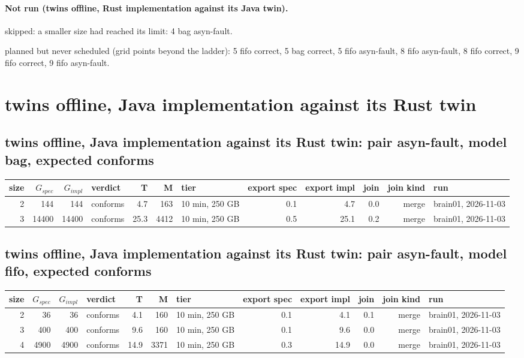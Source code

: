\documentclass[10pt]{article}
\begin{document}
\paragraph{Not run (twins offline, Rust implementation against its Java twin).}
skipped: a smaller size had reached its limit: 4 bag asyn-fault.\par
planned but never scheduled (grid points beyond the ladder): 5 fifo correct, 5 bag correct, 5 fifo asyn-fault, 8 fifo asyn-fault, 8 fifo correct, 9 fifo correct, 9 fifo asyn-fault.\par
\section*{twins offline, Java implementation against its Rust twin}
\subsection*{twins offline, Java implementation against its Rust twin: pair \textsf{asyn-fault}, model bag, expected conforms}
\begin{longtable}{@{}rrrlrrlrrrrl@{}}
\toprule
size & $G_{\mathit{spec}}$ & $G_{\mathit{impl}}$ & verdict & T & M & tier & export spec & export impl & join & join kind & run \\
\midrule
\endhead
\color{blue} 2 & 144 & 144 & conforms & 4.7 & 163 & 10 min, 250 GB & 0.1 & 4.7 & 0.0 & merge & brain01, 2026-11-03 \\
\color{blue} 3 & 14400 & 14400 & conforms & 25.3 & 4412 & 10 min, 250 GB & 0.5 & 25.1 & 0.2 & merge & brain01, 2026-11-03 \\
\bottomrule
\end{longtable}
\subsection*{twins offline, Java implementation against its Rust twin: pair \textsf{asyn-fault}, model fifo, expected conforms}
\begin{longtable}{@{}rrrlrrlrrrrl@{}}
\toprule
size & $G_{\mathit{spec}}$ & $G_{\mathit{impl}}$ & verdict & T & M & tier & export spec & export impl & join & join kind & run \\
\midrule
\endhead
\color{blue} 2 & 36 & 36 & conforms & 4.1 & 160 & 10 min, 250 GB & 0.1 & 4.1 & 0.1 & merge & brain01, 2026-11-03 \\
\color{blue} 3 & 400 & 400 & conforms & 9.6 & 160 & 10 min, 250 GB & 0.1 & 9.6 & 0.0 & merge & brain01, 2026-11-03 \\
\color{blue} 4 & 4900 & 4900 & conforms & 14.9 & 3371 & 10 min, 250 GB & 0.3 & 14.9 & 0.0 & merge & brain01, 2026-11-03 \\
\bottomrule
\end{longtable}
\end{document}
